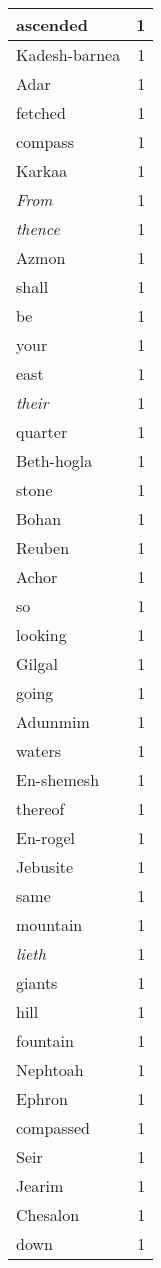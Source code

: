 \begin{center}
\begin{longtable}{l|r}
ascended & 1\\ \hline 
Kadesh-barnea & 1\\ \hline 
Adar & 1\\ \hline 
fetched & 1\\ \hline 
compass & 1\\ \hline 
Karkaa & 1\\ \hline 
\emph{From} & 1\\ \hline 
\emph{thence} & 1\\ \hline 
Azmon & 1\\ \hline 
shall & 1\\ \hline 
be & 1\\ \hline 
your & 1\\ \hline 
east & 1\\ \hline 
\emph{their} & 1\\ \hline 
quarter & 1\\ \hline 
Beth-hogla & 1\\ \hline 
stone & 1\\ \hline 
Bohan & 1\\ \hline 
Reuben & 1\\ \hline 
Achor & 1\\ \hline 
so & 1\\ \hline 
looking & 1\\ \hline 
Gilgal & 1\\ \hline 
going & 1\\ \hline 
Adummim & 1\\ \hline 
waters & 1\\ \hline 
En-shemesh & 1\\ \hline 
thereof & 1\\ \hline 
En-rogel & 1\\ \hline 
Jebusite & 1\\ \hline 
same & 1\\ \hline 
mountain & 1\\ \hline 
\emph{lieth} & 1\\ \hline 
giants & 1\\ \hline 
hill & 1\\ \hline 
fountain & 1\\ \hline 
Nephtoah & 1\\ \hline 
Ephron & 1\\ \hline 
compassed & 1\\ \hline 
Seir & 1\\ \hline 
Jearim & 1\\ \hline 
Chesalon & 1\\ \hline 
down & 1\\ \hline 

\end{longtable}
\end{center}
